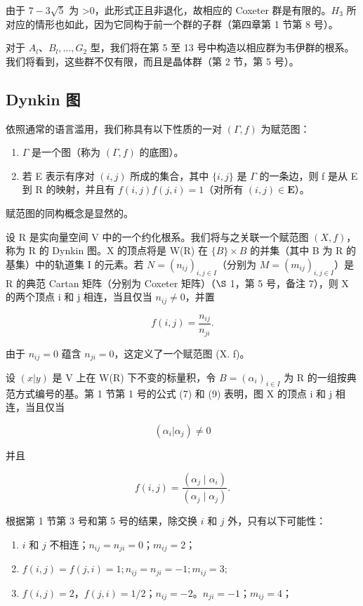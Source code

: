 由于 \(7 - 3\sqrt{5}\) 为 \textgreater0，此形式正且非退化，故相应的 Coxeter 群是有限的。\(H_{3}\) 所对应的情形也如此，因为它同构于前一个群的子群（第四章第 1 节第 8 号）。

对于 \(A_{l}\)、\(B_{l}, \ldots, G_{2}\) 型，我们将在第 5 至 13 号中构造以相应群为韦伊群的根系。我们将看到，这些群不仅有限，而且是晶体群（第 2 节，第 5 号）。

\subsection{Dynkin 图}

依照通常的语言滥用，我们称具有以下性质的一对 \((\Gamma, f)\) 为赋范图：

\begin{enumerate}
\def\labelenumi{\arabic{enumi})}
\item
  \(\Gamma\) 是一个图（称为 \((\Gamma, f)\) 的底图）。
\item
  若 E 表示有序对 \((i,j)\) 所成的集合，其中 \(\{i,j\}\) 是 \(\Gamma\) 的一条边，则 f 是从 E 到 R 的映射，并且有 \(f(i,j)f(j,i)=1\)（对所有 \((i,j)\in\mathbf{E}\)）。
\end{enumerate}

赋范图的同构概念是显然的。

设 R 是实向量空间 V 中的一个约化根系。我们将与之关联一个赋范图 \((X, f)\)，称为 R 的 Dynkin 图。X 的顶点将是 W(R) 在 \(\{B\} \times B\) 的并集（其中 B 为 R 的基集）中的轨道集 I 的元素。若 \(N = (n_{ij})_{i,j \in I}\)（分别为 \(M = (m_{ij})_{i,j \in I}\)）是 R 的典范 Cartan 矩阵（分别为 Coxeter 矩阵）（\(\S\) 1，第 5 号，备注 7），则 X 的两个顶点 i 和 j 相连，当且仅当 \(n_{ij} \neq 0\)，并置

\[
f (i, j) = \frac {n _ {i j}}{n _ {j i}}.
\]

由于 \(n_{ij} = 0\) 蕴含 \(n_{ji} = 0\)，这定义了一个赋范图 (X. f)。

设 \((x|y)\) 是 V 上在 W(R) 下不变的标量积，令 \(B = (\alpha_i)_{i \in I}\) 为 R 的一组按典范方式编号的基。第 1 节第 1 号的公式 (7) 和 (9) 表明，图 X 的顶点 i 和 j 相连，当且仅当

\[
(\alpha_ {i} | \alpha_ {j}) \neq 0
\]

并且

\[
f (i, j) = \frac {\left(\alpha_ {j} \mid \alpha_ {i}\right)}{\left(\alpha_ {j} \mid \alpha_ {j}\right)}.
\]

根据第 1 节第 3 号和第 5 号的结果，除交换 \(i\) 和 \(j\) 外，只有以下可能性：

\begin{enumerate}
\def\labelenumi{\arabic{enumi})}
\item
  \(i\) 和 \(j\) 不相连；\(n_{ij} = n_{ji} = 0\)；\(m_{ij} = 2\)；
\item
  \(f(i,j) = f(j,i) = 1; n_{ij} = n_{ji} = -1; m_{ij} = 3;\)
\item
  \(f(i,j) = 2\)，\(f(j,i) = 1/2\)；\(n_{ij} = -2\)。\(n_{ji} = -1\)；\(m_{ij} = 4\)；
\end{enumerate}

